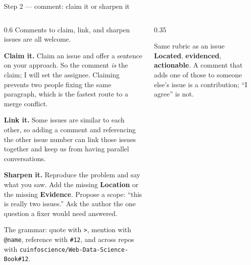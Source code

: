 \documentclass[9pt,aspectratio=169]{beamer}
\begin{document}
\begin{frame}{Step 2 --- comment: claim it or sharpen it}\small
    \begin{columns}[T]
        \begin{column}{0.6\textwidth}
            Comments to claim, link, and sharpen issues are all welcome.

            \medskip

            \textbf{Claim it.} Claim an issue and offer a sentence on your approach. So the comment \textit{is} the claim; I will set the assignee. Claiming prevents two people fixing the same paragraph, which is the fastest route to a merge conflict.

            \medskip

            \textbf{Link it.} Some issues are similar to each other, so adding a comment and referencing the other issue number can link those issues together and keep us from having parallel conversations.

            \medskip

            \textbf{Sharpen it.} Reproduce the problem and say what you saw. Add the missing \textbf{Location} or the missing \textbf{Evidence}. Propose a scope: ``this is really two issues.'' Ask the author the one question a fixer would need answered.

            \medskip

            The grammar: quote with \texttt{>}, mention with \texttt{@name}, reference with \texttt{\#12}, and across repos with \texttt{cuinfoscience/Web-Data-Science-Book\#12}.
        \end{column}
        \begin{column}{0.35\textwidth}
            \begin{alertblock}{Same rubric as an issue}
                \small \textbf{Located}, \textbf{evidenced}, \textbf{actionable}. A comment that adds one of those to someone else's issue is a contribution; ``I agree'' is not.
            \end{alertblock}
        \end{column}
    \end{columns}
\end{frame}
\end{document}
